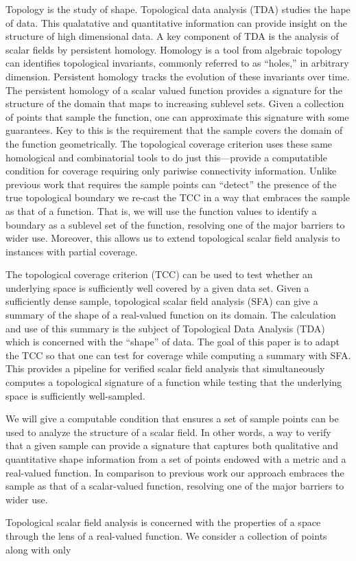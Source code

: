 
Topology is the study of shape.
Topological data analysis (TDA) studies the hape of data.
This qualatative and quantitative information can provide insight on the structure of high dimensional data.
A key component of TDA is the analysis of scalar fields by persistent homology.
Homology is a tool from algebraic topology can identifies topological invariants, commonly referred to as ``holes,'' in arbitrary dimension.
Persistent homology tracks the evolution of these invariants over time.
The persistent homology of a scalar valued function provides a signature for the structure of the domain that maps to increasing sublevel sets.
Given a collection of points that sample the function, one can approximate this signature with some guarantees.
Key to this is the requirement that the sample covers the domain of the function geometrically.
The topological coverage criterion uses these same homological and combinatorial tools to do just this---provide a computatible condition for coverage requiring only pariwise connectivity information.
Unlike previous work that requires the sample points can ``detect'' the presence of the true topological boundary we re-cast the TCC in a way that embraces the sample as that of a function.
That is, we will use the function values to identify a boundary as a sublevel set of the function, resolving one of the major barriers to wider use.
Moreover, this allows us to extend topological scalar field analysis to instances with partial coverage.

The topological coverage criterion (TCC) can be used to test whether an underlying space is sufficiently well covered by a given data set.
Given a sufficiently dense sample, topological scalar field analysis (SFA) can give a summary of the shape of a real-valued function on its domain.
The calculation and use of this summary is the subject of Topological Data Analysis (TDA) which is concerned with the ``shape'' of data.
The goal of this paper is to adapt the TCC so that one can test for coverage while computing a summary with SFA.
This provides a pipeline for verified scalar field analysis that simultaneously computes a topological signature of a function while testing that the underlying space is sufficiently well-sampled.


We will give a computable condition that ensures a set of sample points can be used to analyze the structure of a scalar field.
In other words, a way to verify that a given sample can provide a signature that captures both qualitative and quantitative shape information from a set of points endowed with a metric and a real-valued function.
In comparison to previous work our approach embraces the sample as that of a scalar-valued function, resolving one of the major barriers to wider use.

Topological scalar field analysis is concerned with the properties of a space through the lens of a real-valued function.
We consider a collection of points along with only
